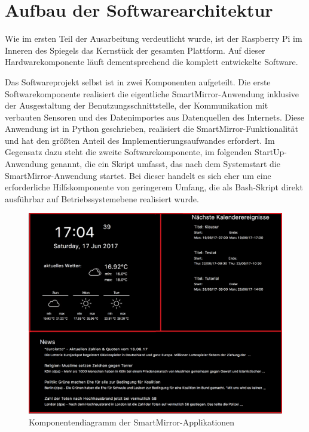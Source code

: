 \section{Aufbau der Softwarearchitektur}
Wie im ersten Teil der Ausarbeitung verdeutlicht wurde, ist der Raspberry Pi im Inneren des Spiegels das Kernstück der gesamten Plattform. Auf dieser Hardwarekomponente läuft dementsprechend die komplett entwickelte Software. 

Das Softwareprojekt selbst ist in zwei Komponenten aufgeteilt. Die erste Softwarekomponente realisiert die eigentliche SmartMirror-Anwendung inklusive der Ausgestaltung der Benutzungsschnittstelle, der Kommunikation mit verbauten Sensoren und des Datenimportes aus Datenquellen des Internets. Diese Anwendung ist in Python geschrieben, realisiert die SmartMirror-Funktionalität und hat den größten Anteil des Implementierungsaufwandes erfordert. Im Gegensatz dazu steht die zweite Softwarekomponente, im folgenden StartUp-Anwendung genannt, die ein Skript umfasst, das nach dem Systemstart die SmartMirror-Anwendung startet. Bei dieser handelt es sich eher um eine erforderliche Hilfskomponente von geringerem Umfang, die als Bash-Skript direkt ausführbar auf Betriebssystemebene realisiert wurde.  

\begin{figure}
	\centering
	\includegraphics[width=0.7\linewidth]{bilder/grafOberflaeche}
	\caption[Komponentendiagramm der SmartMirror-Applikationen]{Komponentendiagramm der SmartMirror-Applikationen}
	\label{fig:komponentendiagramm}
\end{figure}

